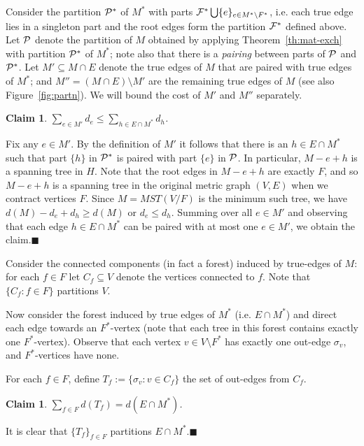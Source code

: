 \documentclass[11pt,twoside,a4paper]{article}
\newtheorem{claim}[theorem]{Claim}
\newenvironment{proof}{

\noindent{\bf Proof:}} {\hfill$\blacksquare$


}
\newcommand{\sse}{\subseteq}
\begin{document}
Consider the partition $\mathcal{P}^*$ of $M^*$ with parts $\mathcal{F}^*\bigcup \{e\}_{e\in M^*\setminus F^*}$, i.e. each true edge lies
in a singleton part  and the root edges form the partition $\mathcal{F}^*$ defined above. Let $\mathcal{P}$    denote the partition of $M$ obtained by applying Theorem~\ref{th:mat-exch} with partition $\mathcal{P}^*$ of $M^*$; note also
that there is a {\em pairing} between parts of $\mathcal{P}$ and $\mathcal{P}^*$. Let $M'\sse M\cap E$ denote the true edges of $M$ that
are paired with true edges of $M^*$; and $M''=(M\cap E) \setminus M'$ are the remaining true edges of $M$ (see also
Figure~\ref{fig:partn}). We will bound the cost of $M'$ and $M''$ separately.

\begin{claim}\label{cl:kmf-m'}
$\sum_{e\in M'} d_e \le \sum_{h\in E\cap M^*} d_h$.
\end{claim}
\begin{proof} Fix any $e\in M'$. By the definition of $M'$ it follows that there is an $h\in E\cap M^*$
such that part $\{h\}$ in $\mathcal{P}^*$ is paired with part $\{e\}$ in $\mathcal{P}$. In particular,  $M-e+h$ is a spanning tree in
$H$. Note that the root edges in $M-e+h$ are exactly $F$, and so $M-e+h$ is a spanning tree in the original metric
graph $(V,E)$ when we contract vertices $F$. Since $M=MST(V/F)$ is the minimum such tree, we have $d(M)-d_e+d_h\ge
d(M)$ or $d_e\le d_h$. Summing over all $e\in M'$ and observing that each edge $h\in E\cap M^*$ can be paired with at
most one $e\in M'$, we obtain the claim.\end{proof}

Consider the connected components (in fact a forest) induced by true-edges of $M$: for each $f\in F$ let $C_f\sse V$
denote the vertices connected to $f$. Note that $\{C_f:f\in F\}$ partitions $V$.

Now consider the forest induced by true edges of $M^*$ (i.e. $E\cap M^*$) and direct each edge towards an $F^*$-vertex
(note that each tree in this forest contains exactly one $F^*$-vertex). Observe that each vertex $v\in V\setminus F^*$
has exactly one out-edge $\sigma_v$, and $F^*$-vertices have none.

For each $f\in F$, define $T_f := \{\sigma_v : v\in C_f\}$ the set of out-edges from $C_f$.
\begin{claim}\label{cl:kmf-m*} $\sum_{f\in F} d(T_f) = d(E\cap M^*)$.
\end{claim}
\begin{proof} It is clear that $\{T_f\}_{f\in F}$ partitions $E\cap M^*$.\end{proof}
\end{document}
